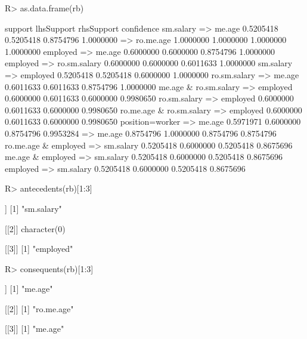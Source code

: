 \documentclass{article}\usepackage[]{graphicx}\usepackage[]{color}
\begin{document}
\begin{Schunk}
% --begin: "searchrules3"
\begin{Sinput}
R> as.data.frame(rb)
\end{Sinput}
\begin{Soutput}
                                       support lhsSupport rhsSupport confidence
sm.salary => me.age                  0.5205418  0.5205418  0.8754796  1.0000000
 => ro.me.age                        1.0000000  1.0000000  1.0000000  1.0000000
employed => me.age                   0.6000000  0.6000000  0.8754796  1.0000000
employed => ro.sm.salary             0.6000000  0.6000000  0.6011633  1.0000000
sm.salary => employed                0.5205418  0.5205418  0.6000000  1.0000000
ro.sm.salary => me.age               0.6011633  0.6011633  0.8754796  1.0000000
me.age & ro.sm.salary => employed    0.6000000  0.6011633  0.6000000  0.9980650
ro.sm.salary => employed             0.6000000  0.6011633  0.6000000  0.9980650
ro.me.age & ro.sm.salary => employed 0.6000000  0.6011633  0.6000000  0.9980650
position=worker => me.age            0.5971971  0.6000000  0.8754796  0.9953284
 => me.age                           0.8754796  1.0000000  0.8754796  0.8754796
ro.me.age & employed => sm.salary    0.5205418  0.6000000  0.5205418  0.8675696
me.age & employed => sm.salary       0.5205418  0.6000000  0.5205418  0.8675696
employed => sm.salary                0.5205418  0.6000000  0.5205418  0.8675696
\end{Soutput}
%
% --end: "searchrules3"
\end{Schunk}

\begin{Schunk}
% --begin: "searchrules4"
\begin{Sinput}
R> antecedents(rb)[1:3]
\end{Sinput}
\begin{Soutput}
[[1]]
[1] "sm.salary"

[[2]]
character(0)

[[3]]
[1] "employed"
\end{Soutput}
\begin{Sinput}
R> consequents(rb)[1:3]
\end{Sinput}
\begin{Soutput}
[[1]]
[1] "me.age"

[[2]]
[1] "ro.me.age"

[[3]]
[1] "me.age"
\end{Soutput}
%
% --end: "searchrules4"
\end{Schunk}
\end{document}
